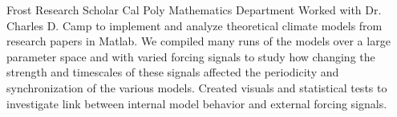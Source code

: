\documentclass[letterpaper, 11pt, sans]{moderncv}
\begin{document}
        {Frost Research Scholar}
        {Cal Poly Mathematics Department}{}{}
        {
            Worked with Dr. Charles D. Camp to implement and analyze theoretical climate models from research papers in Matlab.
            We compiled many runs of the models over a large parameter space and with varied forcing signals to study how changing the strength and timescales of these signals affected the periodicity and synchronization of the various models.
            Created visuals and statistical tests to investigate link between internal model behavior and external forcing signals.
        }


% 
\end{document}
